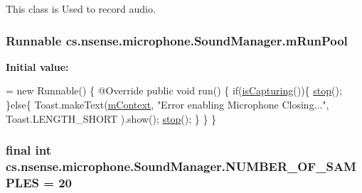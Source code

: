 This class is Used to record audio. \hypertarget{classcs_1_1nsense_1_1microphone_1_1_sound_manager_a53bde011025269b9c80e1be4e52abd45}{
\subsubsection[{m\-Run\-Pool}]{\setlength{\rightskip}{0pt plus 5cm}Runnable cs.\-nsense.\-microphone.\-Sound\-Manager.\-m\-Run\-Pool\hspace{0.3cm}{\ttfamily [private]}}}\label{classcs_1_1nsense_1_1microphone_1_1_sound_manager_a53bde011025269b9c80e1be4e52abd45}
{\bfseries Initial value\-:}
\begin{DoxyCode}
= \textcolor{keyword}{new} Runnable() \{
        @Override
        \textcolor{keyword}{public} \textcolor{keywordtype}{void} run() \{
            \textcolor{keywordflow}{if}(\hyperlink{classcs_1_1nsense_1_1microphone_1_1_sound_manager_aee12cd12c2afc09f0cdfffcac0b5d2fd}{isCapturing}())\{
                \hyperlink{classcs_1_1nsense_1_1microphone_1_1_sound_manager_a1a3e9716b4b44d65e17fadc282734ca2}{stop}();
            \}\textcolor{keywordflow}{else}\{
                Toast.makeText(\hyperlink{classcs_1_1nsense_1_1microphone_1_1_sound_manager_a8a4a3c39bea101e98f8ce22decb085d5}{mContext}, \textcolor{stringliteral}{"Error enabling Microphone Closing..."}, Toast.LENGTH\_SHORT
      ).show();
                \hyperlink{classcs_1_1nsense_1_1microphone_1_1_sound_manager_a1a3e9716b4b44d65e17fadc282734ca2}{stop}();
            \}
        \}
    \}
\end{DoxyCode}
\hypertarget{classcs_1_1nsense_1_1microphone_1_1_sound_manager_a9f9a93940cfbf077ee9a16dfd502c102}{
\subsubsection[{N\-U\-M\-B\-E\-R\-\_\-\-O\-F\-\_\-\-S\-A\-M\-P\-L\-E\-S}]{\setlength{\rightskip}{0pt plus 5cm}final int cs.\-nsense.\-microphone.\-Sound\-Manager.\-N\-U\-M\-B\-E\-R\-\_\-\-O\-F\-\_\-\-S\-A\-M\-P\-L\-E\-S = 20\hspace{0.3cm}{\ttfamily [private]}}}\label{classcs_1_1nsense_1_1microphone_1_1_sound_manager_a9f9a93940cfbf077ee9a16dfd502c102}
